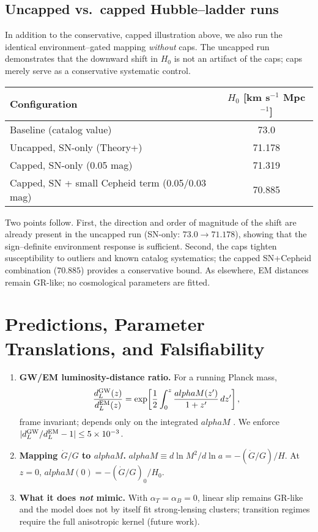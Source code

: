 \documentclass[aps,prd,onecolumn,superscriptaddress,nofootinbib]{revtex4-2}
\def\alphaM{alphaM}%
\newcommand{\alphaM}{\alpha_M}
\begin{document}
\subsection{Uncapped vs.\ capped Hubble–ladder runs}
In addition to the conservative, capped illustration above, we also run the identical environment–gated mapping \emph{without} caps. The uncapped run demonstrates that the downward shift in $H_0$ is not an artifact of the caps; caps merely serve as a conservative systematic control.
\begin{center}
\begin{tabular}{l|c}
\hline
Configuration & $H_0$ [km s$^{-1}$ Mpc$^{-1}$] \\
\hline
Baseline (catalog value) & 73.0 \\
Uncapped, SN-only (Theory+) & 71.178 \\
Capped, SN-only (0.05 mag) & 71.319 \\
Capped, SN + small Cepheid term (0.05/0.03 mag) & 70.885 \\
\hline
\end{tabular}
\end{center}
Two points follow. First, the direction and order of magnitude of the shift are already present in the uncapped run (SN-only: $73.0 \to 71.178$), showing that the sign–definite environment response is sufficient. Second, the caps tighten susceptibility to outliers and known catalog systematics; the capped SN+Cepheid combination ($70.885$) provides a conservative bound. As elsewhere, EM distances remain GR-like; no cosmological parameters are fitted.

\section{Predictions, Parameter Translations, and Falsifiability}
\label{sec:predictions}
\begin{enumerate}[leftmargin=1.3em]
\item \textbf{GW/EM luminosity-distance ratio.} For a running Planck mass,
\begin{equation}
\frac{d_L^{\rm GW}(z)}{d_L^{\rm EM}(z)} = \exp\!\left[ \frac{1}{2}\int_{0}^{z} \frac{\alphaM(z')}{1+z'}\,dz' \right],
\end{equation}
frame invariant; depends only on the integrated $\alphaM$ \cite{LombriserTaylor2016}. We enforce $|d_L^{\rm GW}/d_L^{\rm EM}-1|\le 5\times10^{-3}$.
\item \textbf{Mapping $\dot G/G$ to $\alphaM$.}
$\alphaM \equiv d\ln M^2/d\ln a = -(\dot G/G)/H$. At $z=0$, $\alphaM(0)=-(\dot G/G)_0/H_0$.
\item \textbf{What it does \emph{not} mimic.} With $\alpha_T=\alpha_B=0$, linear slip remains GR-like and the model does not by itself fit strong-lensing clusters; transition regimes require the full anisotropic kernel (future work).
\end{enumerate}
\end{document}
